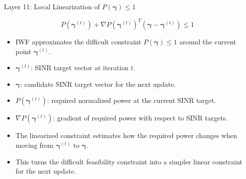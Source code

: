 \documentclass{beamer}
\begin{document}
\begin{frame}{Layer 11: Local Linearization of \(P(\boldsymbol{\gamma})\le1\)}
\scriptsize

\[
P(\boldsymbol{\gamma}^{(t)})
+
\nabla P(\boldsymbol{\gamma}^{(t)})^T
\left(
\boldsymbol{\gamma}-\boldsymbol{\gamma}^{(t)}
\right)
\le 1
\]

\begin{itemize}
    \item IWF approximates the difficult constraint \(P(\boldsymbol{\gamma})\le1\) around the current point \(\boldsymbol{\gamma}^{(t)}\).

    \item \(\boldsymbol{\gamma}^{(t)}\): SINR target vector at iteration \(t\).

    \item \(\boldsymbol{\gamma}\): candidate SINR target vector for the next update.

    \item \(P(\boldsymbol{\gamma}^{(t)})\): required normalized power at the current SINR target.

    \item \(\nabla P(\boldsymbol{\gamma}^{(t)})\): gradient of required power with respect to SINR targets.

    \item The linearized constraint estimates how the required power changes when moving from \(\boldsymbol{\gamma}^{(t)}\) to \(\boldsymbol{\gamma}\).

    \item This turns the difficult feasibility constraint into a simpler linear constraint for the next update.
\end{itemize}

\end{frame}
\end{document}
